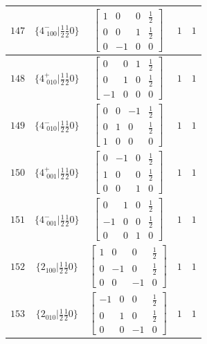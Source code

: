 \documentclass[fleqn,8pt]{jsarticle}
\begin{document}
\begin{longtable}{ccccc}
$ 147 $ & $ \{4^{-}_{\,\,100}|\frac{1}{2} \frac{1}{2} 0\} $ & $ \begin{bmatrix} 1 & 0 & 0 & \frac{1}{2} \\ 0 & 0 & 1 & \frac{1}{2} \\ 0 & -1 & 0 & 0 \end{bmatrix} $ & $ 1 $ & $ 1 $ \\ \hline
$ 148 $ & $ \{4^{+}_{\,\,010}|\frac{1}{2} \frac{1}{2} 0\} $ & $ \begin{bmatrix} 0 & 0 & 1 & \frac{1}{2} \\ 0 & 1 & 0 & \frac{1}{2} \\ -1 & 0 & 0 & 0 \end{bmatrix} $ & $ 1 $ & $ 1 $ \\ \hline
$ 149 $ & $ \{4^{-}_{\,\,010}|\frac{1}{2} \frac{1}{2} 0\} $ & $ \begin{bmatrix} 0 & 0 & -1 & \frac{1}{2} \\ 0 & 1 & 0 & \frac{1}{2} \\ 1 & 0 & 0 & 0 \end{bmatrix} $ & $ 1 $ & $ 1 $ \\ \hline
$ 150 $ & $ \{4^{+}_{\,\,001}|\frac{1}{2} \frac{1}{2} 0\} $ & $ \begin{bmatrix} 0 & -1 & 0 & \frac{1}{2} \\ 1 & 0 & 0 & \frac{1}{2} \\ 0 & 0 & 1 & 0 \end{bmatrix} $ & $ 1 $ & $ 1 $ \\ \hline
$ 151 $ & $ \{4^{-}_{\,\,001}|\frac{1}{2} \frac{1}{2} 0\} $ & $ \begin{bmatrix} 0 & 1 & 0 & \frac{1}{2} \\ -1 & 0 & 0 & \frac{1}{2} \\ 0 & 0 & 1 & 0 \end{bmatrix} $ & $ 1 $ & $ 1 $ \\ \hline
$ 152 $ & $ \{2{}_{100}|\frac{1}{2} \frac{1}{2} 0\} $ & $ \begin{bmatrix} 1 & 0 & 0 & \frac{1}{2} \\ 0 & -1 & 0 & \frac{1}{2} \\ 0 & 0 & -1 & 0 \end{bmatrix} $ & $ 1 $ & $ 1 $ \\ \hline
$ 153 $ & $ \{2{}_{010}|\frac{1}{2} \frac{1}{2} 0\} $ & $ \begin{bmatrix} -1 & 0 & 0 & \frac{1}{2} \\ 0 & 1 & 0 & \frac{1}{2} \\ 0 & 0 & -1 & 0 \end{bmatrix} $ & $ 1 $ & $ 1 $ \\ \hline

\end{longtable}
\end{document}
